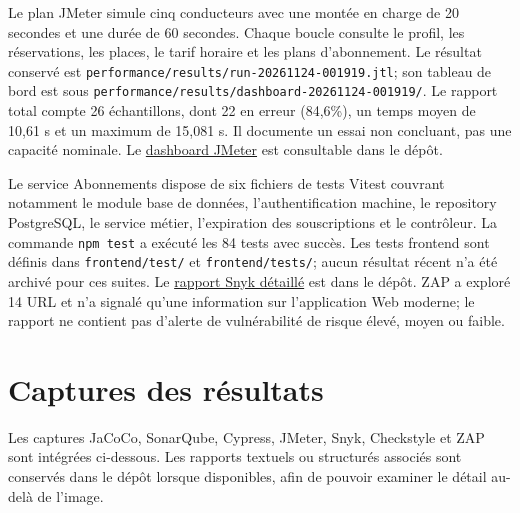 \documentclass[11pt,a4paper]{report}
\begin{document}
Le plan JMeter simule cinq conducteurs avec une montée en charge de 20 secondes et une durée de 60 secondes. Chaque boucle consulte le profil, les réservations, les places, le tarif horaire et les plans d'abonnement. Le résultat conservé est \texttt{performance/results/run-20261124-001919.jtl}; son tableau de bord est sous \texttt{performance/results/dashboard-20261124-001919/}. Le rapport total compte 26 échantillons, dont 22 en erreur (84,6\%), un temps moyen de 10,61 s et un maximum de 15,081 s. Il documente un essai non concluant, pas une capacité nominale. Le \href{../../performance/results/dashboard-20261124-001919/index.html}{dashboard JMeter} est consultable dans le dépôt.

Le service Abonnements dispose de six fichiers de tests Vitest couvrant notamment le module base de données, l'authentification machine, le repository PostgreSQL, le service métier, l'expiration des souscriptions et le contrôleur. La commande \texttt{npm test} a exécuté les 84 tests avec succès. Les tests frontend sont définis dans \texttt{frontend/test/} et \texttt{frontend/tests/}; aucun résultat récent n'a été archivé pour ces suites. Le \href{../../security/reports/snyk-open-source.json}{rapport Snyk détaillé} est dans le dépôt. ZAP a exploré 14 URL et n'a signalé qu'une information sur l'application Web moderne; le rapport ne contient pas d'alerte de vulnérabilité de risque élevé, moyen ou faible.

\section{Captures des résultats}
Les captures JaCoCo, SonarQube, Cypress, JMeter, Snyk, Checkstyle et ZAP sont intégrées ci-dessous. Les rapports textuels ou structurés associés sont conservés dans le dépôt lorsque disponibles, afin de pouvoir examiner le détail au-delà de l'image.
\end{document}
